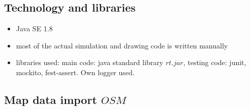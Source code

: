 \subsection{Technology and libraries}
\begin{itemize}
    \item Java SE 1.8
    \item most of the actual simulation and drawing code is written manually
    \item libraries used: main code: java standard library \(rt.jar\), testing code: junit, mockito, fest-assert. Own logger used.
\end{itemize}


\subsection{Map data import \(OSM\)}
